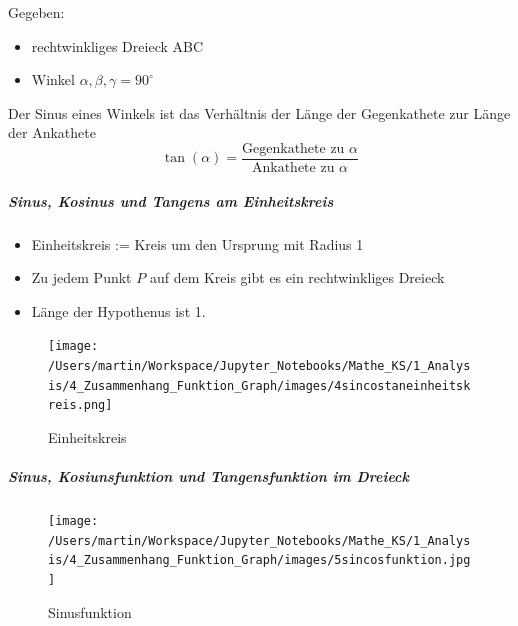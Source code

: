 \documentclass[
  11pt,
  a4paper,
  DIV=11,
  numbers=noendperiod]{scrartcl}
\let\oldsubparagraph\subparagraph
\renewcommand{\subparagraph}[1]{\oldsubparagraph{#1}\mbox{}}
\providecommand{\tightlist}{%
  \setlength{\itemsep}{0pt}\setlength{\parskip}{0pt}}\usepackage{longtable,booktabs,array}
\begin{document}
\begin{tcolorbox}[enhanced jigsaw, colbacktitle=quarto-callout-note-color!10!white, breakable, bottomtitle=1mm, toptitle=1mm, opacitybacktitle=0.6, opacityback=0, rightrule=.15mm, titlerule=0mm, leftrule=.75mm, colframe=quarto-callout-note-color-frame, toprule=.15mm, left=2mm, colback=white, title=\textcolor{quarto-callout-note-color}{\faInfo}\hspace{0.5em}{Definition: Tangens}, coltitle=black, arc=.35mm, bottomrule=.15mm]

Gegeben:

\begin{itemize}
\tightlist
\item
  rechtwinkliges Dreieck ABC
\item
  Winkel \(\alpha, \beta, \gamma = 90^\circ\)
\end{itemize}

Der Sinus eines Winkels ist das Verhältnis der Länge der Gegenkathete
zur Länge der Ankathete \[
\tan(\alpha) =  \frac{\text{Gegenkathete zu }\alpha}{\text{Ankathete zu }\alpha}
\]

\end{tcolorbox}

\subparagraph{Sinus, Kosinus und Tangens am
Einheitskreis}\label{sinus-kosinus-und-tangens-am-einheitskreis}

\begin{itemize}
\tightlist
\item
  Einheitskreis := Kreis um den Ursprung mit Radius 1
\item
  Zu jedem Punkt \(P\) auf dem Kreis gibt es ein rechtwinkliges Dreieck
\item
  Länge der Hypothenus ist 1.
\end{itemize}

\begin{figure}[H]

{\centering \texttt{[image: /Users/martin/Workspace/Jupyter\_Notebooks/Mathe\_KS/1\_Analysis/4\_Zusammenhang\_Funktion\_Graph/images/4sincostaneinheitskreis.png]}

}

\caption{Einheitskreis}

\end{figure}%

\subparagraph{Sinus, Kosiunsfunktion und Tangensfunktion im
Dreieck}\label{sinus-kosiunsfunktion-und-tangensfunktion-im-dreieck}

\begin{figure}[H]

{\centering \texttt{[image: /Users/martin/Workspace/Jupyter\_Notebooks/Mathe\_KS/1\_Analysis/4\_Zusammenhang\_Funktion\_Graph/images/5sincosfunktion.jpg]}

}

\caption{Sinusfunktion}

\end{figure}%
\end{document}
